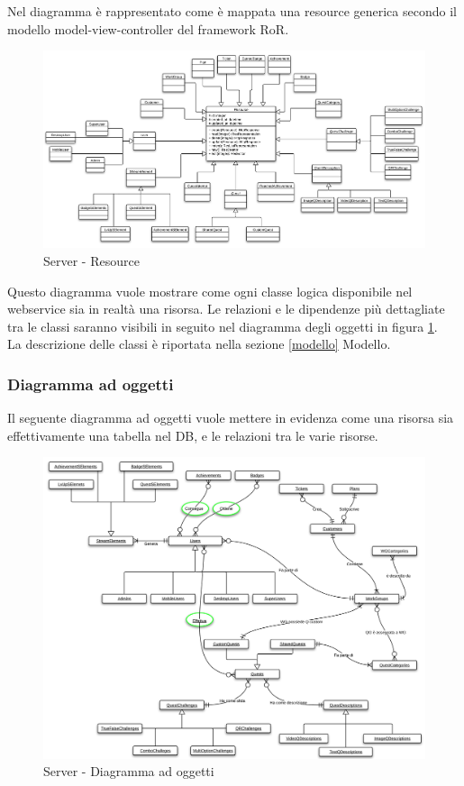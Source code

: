 Nel diagramma è rappresentato come è mappata una resource generica secondo il modello model-view-controller del framework RoR.

\begin{figure}[H]
\centering
\includegraphics[scale=0.50]{images/Server/Resource.png}
\caption{Server - Resource}
\end{figure}

Questo diagramma vuole mostrare come ogni classe logica disponibile nel webservice sia in realtà una risorsa. Le relazioni e le dipendenze più dettagliate tra le classi saranno visibili in seguito nel diagramma degli oggetti in figura \ref{S-do}.\\
La descrizione delle classi è riportata nella sezione \ref{modello} Modello.


\subsubsection{Diagramma ad oggetti}
Il seguente diagramma ad oggetti vuole mettere in evidenza come una risorsa sia effettivamente una tabella nel DB, e le relazioni tra le varie risorse.

\begin{figure}[h]
\centering
\includegraphics[scale=0.55]{images/Server/Oggetti.png}
\caption{Server - Diagramma ad oggetti}
\label{S-do}  %
\end{figure}

